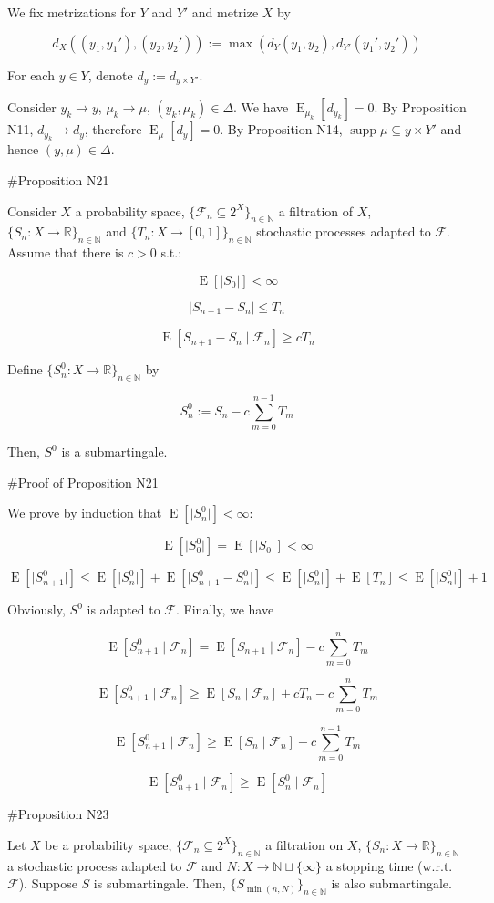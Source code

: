 \documentclass[a4paper]{article}
\DeclareMathOperator{\Supp}{supp}
\DeclareMathOperator{\E}{E}
\newcommand{\Nats}{\mathbb{N}}
\newcommand{\Reals}{\mathbb{R}}
\newcommand{\Sq}[2]{\{#1\}_{#2 \in \Nats}}
\newcommand{\Sqn}[1]{\Sq{#1}{n}}
\newcommand{\Abs}[1]{\lvert #1 \rvert}
\newcommand{\F}{\mathcal{F}}
\begin{document}
We fix metrizations for ${Y}$ and ${Y'}$ and metrize ${X}$ by 

$${d_X((y_1,y_1'),(y_2,y_2')):=\max(d_Y(y_1,y_2),d_{Y'}(y_1',y_2'))}$$

For each ${y \in Y}$, denote ${d_{y}:=d_{y \times Y'}}$.

Consider ${y_k \rightarrow y}$, ${\mu_k \rightarrow \mu}$, ${(y_k, \mu_k) \in \Delta}$. We have ${\E_{\mu_k}[d_{y_k}]=0}$. By Proposition N11, ${d_{y_k} \rightarrow d_y}$, therefore ${\E_\mu[d_y] = 0}$. By Proposition N14, ${\Supp \mu \subseteq y \times Y'}$ and hence ${(y,\mu) \in \Delta}$.

\#Proposition N21

Consider ${X}$ a probability space, ${\{\F_n \subseteq 2^X\}_{n \in \Nats}}$ a filtration of ${X}$, ${\{S_n:X \rightarrow \Reals\}_{n \in \Nats}}$ and ${\{T_n:X \rightarrow [0,1]\}_{n \in \Nats}}$ stochastic processes adapted to ${\F}$. Assume that there is ${c > 0}$ s.t.:

$$\E[\Abs{S_0}] < \infty$$

$$\Abs{S_{n+1}-S_n} \leq T_n$$

$$\E[S_{n+1} - S_n \mid \F_n] \geq c T_n$$

Define ${\Sqn{S^0_n: X \rightarrow \Reals}}$ by

$$S^0_n := S_n - c \sum_{m=0}^{n-1} T_m$$
 
Then, ${S^0}$ is a submartingale.

\#Proof of Proposition N21

We prove by induction that ${\E[\Abs{S^0_n}] < \infty}$:

$${\E[\Abs{S^0_0}] = \E[\Abs{S_0}] < \infty}$$

$$\E[\Abs{S^0_{n+1}}] \leq \E[\Abs{S^0_n}] + \E[\Abs{S^0_{n+1}-S^0_n}] \leq \E[\Abs{S^0_n}] + \E[T_n] \leq \E[\Abs{S^0_n}] + 1$$

Obviously, ${S^0}$ is adapted to ${\F}$. Finally, we have

$$\E[S^0_{n+1} \mid \F_n] = \E[S_{n+1} \mid \F_n] - c \sum_{m = 0}^{n} T_m$$

$$\E[S^0_{n+1} \mid \F_n] \geq \E[S_{n} \mid \F_n] + c T_n - c \sum_{m = 0}^{n} T_m$$

$$\E[S^0_{n+1} \mid \F_n] \geq \E[S_{n} \mid \F_n] - c \sum_{m = 0}^{n - 1} T_m$$

$$\E[S^0_{n+1} \mid \F_n] \geq \E[S^0_{n} \mid \F_n]$$

\#Proposition N23

Let ${X}$ be a probability space, ${\Sqn{\F_n \subseteq 2^X}}$ a filtration on ${X}$, ${\Sqn{S_n: X \rightarrow \Reals}}$ a stochastic process adapted to ${\F}$ and ${N: X \rightarrow \Nats \sqcup \{\infty\}}$ a stopping time (w.r.t. ${\F}$). Suppose ${S}$ is submartingale. Then, ${\Sqn{S_{\min(n,N)}}}$ is also submartingale.
\end{document}
